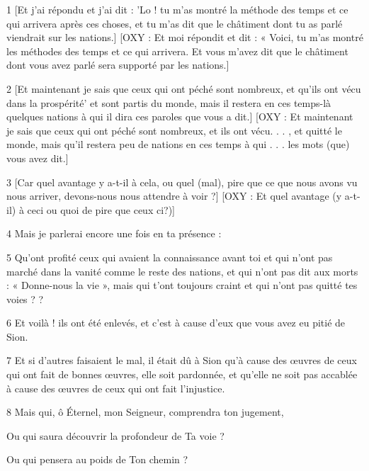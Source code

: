 \par 1 [Et j'ai répondu et j'ai dit : 'Lo ! tu m'as montré la méthode des temps et ce qui arrivera après ces choses, et tu m'as dit que le châtiment dont tu as parlé viendrait sur les nations.] [OXY : Et moi répondit et dit : « Voici, tu m'as montré les méthodes des temps et ce qui arrivera. Et vous m'avez dit que le châtiment dont vous avez parlé sera supporté par les nations.]

\par 2 [Et maintenant je sais que ceux qui ont péché sont nombreux, et qu'ils ont vécu dans la prospérité' et sont partis du monde, mais il restera en ces temps-là quelques nations à qui il dira ces paroles que vous a dit.] [OXY : Et maintenant je sais que ceux qui ont péché sont nombreux, et ils ont vécu. . . , et quitté le monde, mais qu'il restera peu de nations en ces temps à qui . . . les mots (que) vous avez dit.]

\par 3 [Car quel avantage y a-t-il à cela, ou quel (mal), pire que ce que nous avons vu nous arriver, devons-nous nous attendre à voir ?] [OXY : Et quel avantage (y a-t-il) à ceci ou quoi de pire que ceux ci?)]

\par 4 Mais je parlerai encore une fois en ta présence :

\par 5 Qu'ont profité ceux qui avaient la connaissance avant toi et qui n'ont pas marché dans la vanité comme le reste des nations, et qui n'ont pas dit aux morts : « Donne-nous la vie », mais qui t'ont toujours craint et qui n'ont pas quitté tes voies ? ?

\par 6 Et voilà ! ils ont été enlevés, et c'est à cause d'eux que vous avez eu pitié de Sion.

\par 7 Et si d'autres faisaient le mal, il était dû à Sion qu'à cause des œuvres de ceux qui ont fait de bonnes œuvres, elle soit pardonnée, et qu'elle ne soit pas accablée à cause des œuvres de ceux qui ont fait l'injustice.

\par 8 Mais qui, ô Éternel, mon Seigneur, comprendra ton jugement,

\par Ou qui saura découvrir la profondeur de Ta voie ?

\par Ou qui pensera au poids de Ton chemin ?

